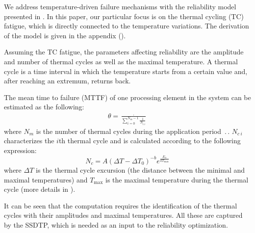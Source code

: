 We address temperature-driven failure mechanisms with the reliability model presented in \cite{huang2009, xiang2010}. In this paper, our particular focus is on the thermal cycling (TC) fatigue, which is directly connected to the temperature variations. The derivation of the model is given in the appendix ().

Assuming the TC fatigue, the parameters affecting reliability are the amplitude and number of thermal cycles as well as the maximal temperature. A thermal cycle is a time interval in which the temperature starts from a certain value and, after reaching an extremum, returns back.

The mean time to failure (MTTF) of one processing element in the system can be estimated as the following:
\begin{align} \label{eq:one-mttf}
  \theta = \frac{\period}{\sum_{i=0}^{N_m - 1} \frac{1}{N_{c \: i}}}
\end{align}
where $N_m$ is the number of thermal cycles during the application period $\period$. $N_{c \: i}$ characterizes the $i$th thermal cycle and is calculated according to the following expression:
\begin{equation} \label{eq:cycles-to-failure}
  N_c = A (\Delta T - \Delta T_0)^{-b} e^{\frac{E_a}{k T_\text{max}}}
\end{equation}
where $\Delta T$ is the thermal cycle excursion (the distance between the minimal and maximal temperatures) and $T_\text{max}$ is the maximal temperature during the thermal cycle (more details in ).

It can be seen that the computation requires the identification of the thermal cycles with their amplitudes and maximal temperatures. All these are captured by the SSDTP, which is needed as an input to the reliability optimization.
